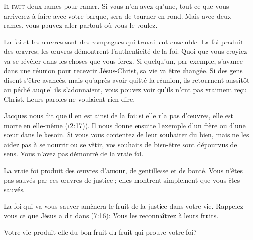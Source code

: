 


\lettrine{I}{l faut} deux rames pour ramer.
 Si vous n'en avez qu'une, tout ce que vous arriverez à faire
 avec votre barque, sera de tourner en rond.
 Mais avec deux rames, vous pouvez aller partout où vous le voulez. 

La foi et les \oe{}uvres sont des compagnes qui travaillent ensemble.
 La foi produit des \oe{}uvres; les \oe{}uvres démontrent l'authenticité de la foi.
 Quoi que vous croyiez va se révéler dans les choses que vous ferez.
 Si quelqu'un, par exemple, s'avance dans une réunion pour recevoir
 Jésus-Christ, sa vie va être changée. Si des gens disent s'être avancés,
 mais qu'après avoir quitté la réunion, ils retournent aussitôt au péché
 auquel ils s'adonnaient, vous pouvez voir qu'ils n'ont pas vraiment
 re\c{c}u Christ. Leurs paroles ne voulaient rien dire. 


Jacques nous dit que \Og il en est ainsi de la foi: si elle n'a pas d'\oe{}uvres,
 elle est morte en elle-même \Fg{} ((2:17)).
 Il nous donne ensuite l'exemple d'un frère ou d'une s\oe{}ur dans le besoin.
 Si vous vous contentez de leur souhaiter du bien, mais ne les aidez pas
 à se nourrir ou se vêtir, vos souhaits de bien-être sont dépourvus de sens.
 Vous n'avez pas démontré de la vraie foi. 

La vraie foi produit des \oe{}uvres d'amour, de gentillesse et de bonté.
 Vous n'êtes pas sauvés par ces \oe{}uvres de justice ;
 elles montrent simplement que vous êtes sauvés. 

La foi qui va vous sauver amènera le fruit de la justice dans votre vie.
 Rappelez-vous ce que Jésus a dit dans (7:16): 
 \Og Vous les reconnaîtrez à leurs fruits. \Fg{}

Votre vie produit-elle du bon fruit \ocadr du fruit qui prouve votre foi? 

\dvrule


